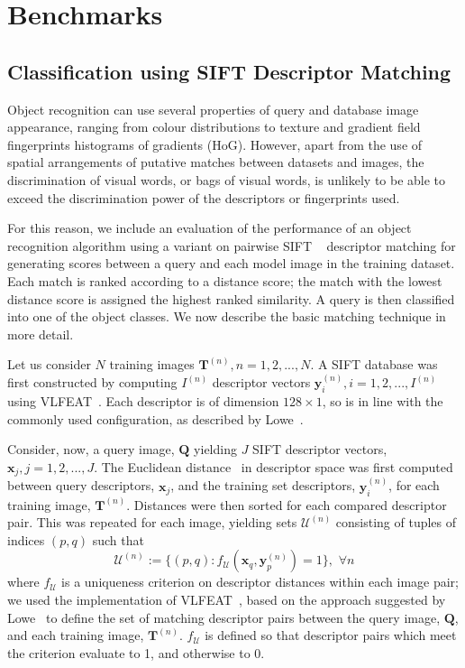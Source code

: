 \section{Benchmarks} \label{sec:benchmarks}




\subsection{Classification using SIFT Descriptor Matching}

Object recognition can use several properties of query and database image appearance, ranging from colour distributions to texture and gradient field fingerprints \eg histograms of gradients (HoG). However, apart from the use of spatial arrangements of putative matches between datasets and images, the discrimination of visual words, or bags of visual words, is unlikely to be able to exceed the discrimination power of the descriptors or fingerprints used.

For this reason, we include an evaluation of the performance of an object recognition algorithm using a variant on pairwise SIFT ~\cite{Lowe2004} descriptor matching for generating scores between a query and each model image in the training dataset. Each match is ranked according to a distance score; the match with the lowest distance score is assigned the highest ranked similarity. A query is then classified into one of the object classes. We now describe the basic matching technique in more detail.

Let us consider $N$ training images $\mathbf{T}^{(n)}, n = 1, 2, ..., N$. A SIFT database was first constructed by computing $I^{(n)}$ descriptor vectors $\mathbf{y}_i^{(n)}, i = 1, 2, ..., I^{(n)}$ using VLFEAT~\cite{Vedaldi2008}. Each descriptor is of dimension $128\times 1$, so is in line with the commonly used configuration, as described by Lowe~\cite{Lowe2004}.

Consider, now, a query image, $\mathbf{Q}$ yielding $J$ SIFT descriptor vectors, $\mathbf{x}_j, j = 1,2,...,J$. The Euclidean distance~\cite{Vedaldi2008} in descriptor space was first computed between query descriptors, $\mathbf{x}_j$, and the training set descriptors, $\mathbf{y}_i^{(n)}$, for each training image, $\mathbf{T}^{(n)}$. Distances were then sorted for each compared descriptor pair.  This was repeated for each image, yielding sets $\mathcal{U}^{(n)}$ consisting of tuples of indices $(p,q)$ such that
\[
\mathcal{U}^{(n)} := \lbrace (p,q): f_\mathcal{U}(\mathbf{x}_q,\mathbf{y}_p^{(n)})=1\rbrace,\,\,\forall n
\]
where $f_{\mathcal{U}}$ is a uniqueness criterion on descriptor distances within each image pair; we used the implementation of VLFEAT~\cite{Vedaldi2008}, based on the approach suggested by Lowe~\cite{Lowe2004} to define the set of matching descriptor pairs between the query image, $\mathbf{Q}$, and each training image, $\mathbf{T}^{(n)}$. $f_{\mathcal{U}}$ is defined so that descriptor pairs which meet the criterion evaluate to 1, and otherwise to 0. 

